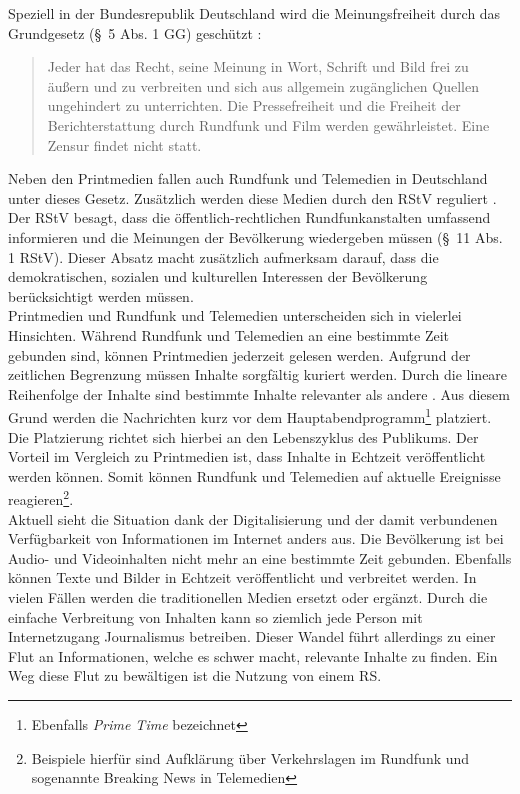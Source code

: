 Speziell in der Bundesrepublik Deutschland wird die Meinungsfreiheit durch das Grundgesetz (§ 5 Abs. 1 GG) geschützt \cite{gg}:
\begin{quote}
    \glqq Jeder hat das Recht, seine Meinung in Wort, Schrift und Bild frei zu äußern und zu verbreiten und sich aus allgemein zugänglichen Quellen ungehindert zu unterrichten.
    Die Pressefreiheit und die Freiheit der Berichterstattung durch Rundfunk und Film werden gewährleistet.
    Eine Zensur findet nicht statt.\grqq{}
\end{quote}
Neben den Printmedien fallen auch Rundfunk und Telemedien in Deutschland unter dieses Gesetz.
Zusätzlich werden diese Medien durch den \ac{RStV} reguliert \cite{rundfunkstaatsvertrag}.
Der \ac{RStV} besagt, dass die öffentlich-rechtlichen Rundfunkanstalten umfassend informieren und die Meinungen der Bevölkerung wiedergeben müssen (§ 11 Abs. 1 \ac{RStV}).
Dieser Absatz macht zusätzlich aufmerksam darauf, dass die demokratischen, sozialen und kulturellen Interessen der Bevölkerung berücksichtigt werden müssen. \\

Printmedien und Rundfunk und Telemedien unterscheiden sich in vielerlei Hinsichten.
Während Rundfunk und Telemedien an eine bestimmte Zeit gebunden sind, können Printmedien jederzeit gelesen werden.
Aufgrund der zeitlichen Begrenzung müssen Inhalte sorgfältig kuriert werden.
Durch die lineare Reihenfolge der Inhalte sind bestimmte Inhalte relevanter als andere \cite{rundfunk}.
Aus diesem Grund werden die Nachrichten kurz vor dem Hauptabendprogramm\footnote{Ebenfalls \textit{Prime Time} bezeichnet} platziert.
Die Platzierung richtet sich hierbei an den Lebenszyklus des Publikums.
Der Vorteil im Vergleich zu Printmedien ist, dass Inhalte in Echtzeit veröffentlicht werden können.
Somit können Rundfunk und Telemedien auf aktuelle Ereignisse reagieren\footnote{Beispiele hierfür sind Aufklärung über Verkehrslagen im Rundfunk und sogenannte Breaking News in Telemedien}. \\

Aktuell sieht die Situation dank der Digitalisierung und der damit verbundenen Verfügbarkeit von Informationen im Internet anders aus.
Die Bevölkerung ist bei Audio- und Videoinhalten nicht mehr an eine bestimmte Zeit gebunden.
Ebenfalls können Texte und Bilder in Echtzeit veröffentlicht und verbreitet werden.
In vielen Fällen werden die traditionellen Medien ersetzt oder ergänzt.
Durch die einfache Verbreitung von Inhalten kann so ziemlich jede Person mit Internetzugang Journalismus betreiben.
Dieser Wandel führt allerdings zu einer Flut an Informationen, welche es schwer macht, relevante Inhalte zu finden.
Ein Weg diese Flut zu bewältigen ist die Nutzung von einem \ac{RS}.


